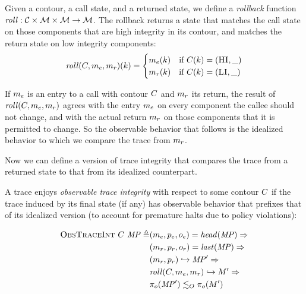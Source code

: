 \documentclass[acmsmall,review,anonymous]{acmart}\settopmatter{printfolios=true,printccs=false,printacmref=false}
\begin{document}
{      

      Given a contour, a call state, and a returned state, we define a
      {\em rollback} function \(\mathit{roll} : {\mathcal C} \times {\mathcal M} \times
      {\mathcal M} \rightarrow {\mathcal M}\). The rollback returns a state that matches
      the call state on those components that are high integrity in its
      contour, and matches the return state on low integrity components:
      \[\mathit{roll}(C,m_e,m_r)(k) =
      \begin{cases}
        m_e(k) & \text{if } C(k) = (\textsc{HI},\_) \\
        m_r(k) & \text{if } C(k) = (\textsc{LI},\_) \\
      \end{cases}\]

      If \(m_e\) is an entry to a call with contour \(C\)
      and \(m_r\) its return, the result of
      \(\mathit{roll}(C,m_e,m_r)\) agrees with the
      entry \(m_e\) on every component the callee should not
      change, and with the actual return \(m_r\) on those
      components that it is permitted to change.  So the observable
      behavior that follows is the idealized behavior to which we
      compare the trace from \(m_r\).

      Now we can define a version of trace integrity that compares the trace
      from a returned state to that from its idealized counterpart.


      A trace enjoys {\em observable trace integrity} with respect to
      some contour \(C\) if the trace induced by its final
      state (if any) has observable behavior that prefixes that of its
      idealized version (to account for premature halts due to policy
      violations):

      \[\begin{split}
        \text{\sc ObsTraceInt} ~ C ~ \mathit{MP} \triangleq
        & (m_e,p_e,o_e) = \mathit{head}(\mathit{MP}) \Rightarrow \\
        & (m_r,p_r,o_r) = \mathit{last}(\mathit{MP}) \Rightarrow \\
        & (m_r,p_r) \hookrightarrow \mathit{MP}' \Rightarrow \\
        & \mathit{roll}(C,m_e,m_r) \hookrightarrow M'
          \Rightarrow \\
        & \pi_o(\mathit{MP}') \lesssim_O \pi_o(M')
      \end{split}\]

}
\end{document}
